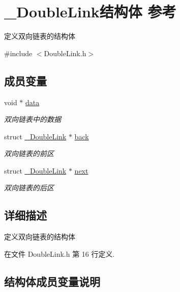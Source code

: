\hypertarget{struct___double_link}{}\section{\+\_\+\+Double\+Link结构体 参考}
\label{struct___double_link}


定义双向链表的结构体  




{\ttfamily \#include $<$Double\+Link.\+h$>$}

\subsection*{成员变量}
\begin{DoxyCompactItemize}
\item 
void $\ast$ \hyperlink{struct___double_link_a735984d41155bc1032e09bece8f8d66d}{data}
\begin{DoxyCompactList}\small\item\em 双向链表中的数据 \end{DoxyCompactList}\item 
struct \hyperlink{struct___double_link}{\+\_\+\+Double\+Link} $\ast$ \hyperlink{struct___double_link_a958749bf22e72387e49a9acaf942687f}{back}
\begin{DoxyCompactList}\small\item\em 双向链表的前区 \end{DoxyCompactList}\item 
struct \hyperlink{struct___double_link}{\+\_\+\+Double\+Link} $\ast$ \hyperlink{struct___double_link_a0efbf988904af75293c400185b0ea6b0}{next}
\begin{DoxyCompactList}\small\item\em 双向链表的后区 \end{DoxyCompactList}\end{DoxyCompactItemize}


\subsection{详细描述}
定义双向链表的结构体 

在文件 Double\+Link.\+h 第 16 行定义.



\subsection{结构体成员变量说明}
\hypertarget{struct___double_link_a958749bf22e72387e49a9acaf942687f}{}
